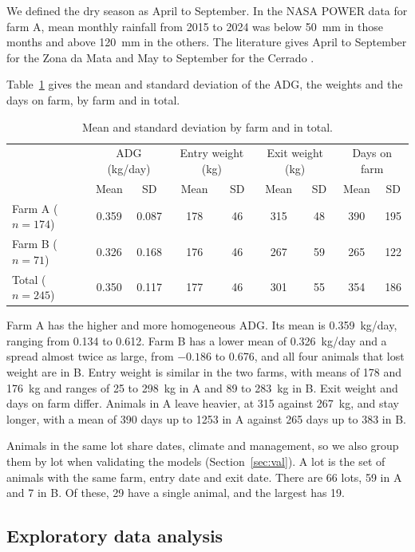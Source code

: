 \documentclass[runningheads]{llncs}
\begin{document}
We defined the dry season as April to September. In the NASA POWER data for farm A, mean monthly rainfall from 2015 to 2024 was below 50~mm in those months and above 120~mm in the others. The literature gives April to September for the Zona da Mata \cite{furlong1985} and May to September for the Cerrado \cite{gomes2015estrategias}.

Table~\ref{tab:desc} gives the mean and standard deviation of the ADG, the weights and the days on farm, by farm and in total.

\begin{table}[H]
\caption{Mean and standard deviation by farm and in total.}\label{tab:desc}
\small
\setlength{\tabcolsep}{4pt}
\begin{tabular}{lcccccccc}
\hline
 & \multicolumn{2}{c}{ADG (kg/day)} & \multicolumn{2}{c}{Entry weight (kg)} & \multicolumn{2}{c}{Exit weight (kg)} & \multicolumn{2}{c}{Days on farm}\\
 & Mean & SD & Mean & SD & Mean & SD & Mean & SD\\
\hline
Farm A ($n=174$) & 0.359 & 0.087 & 178 & 46 & 315 & 48 & 390 & 195\\
Farm B ($n=71$) & 0.326 & 0.168 & 176 & 46 & 267 & 59 & 265 & 122\\
Total ($n=245$) & 0.350 & 0.117 & 177 & 46 & 301 & 55 & 354 & 186\\
\hline
\end{tabular}
\end{table}

Farm A has the higher and more homogeneous ADG. Its mean is 0.359~kg/day, ranging from 0.134 to 0.612. Farm B has a lower mean of 0.326~kg/day and a spread almost twice as large, from $-0.186$ to 0.676, and all four animals that lost weight are in B. Entry weight is similar in the two farms, with means of 178 and 176~kg and ranges of 25 to 298~kg in A and 89 to 283~kg in B. Exit weight and days on farm differ. Animals in A leave heavier, at 315 against 267~kg, and stay longer, with a mean of 390 days up to 1253 in A against 265 days up to 383 in B.

Animals in the same lot share dates, climate and management, so we also group them by lot when validating the models (Section~\ref{sec:val}). A lot is the set of animals with the same farm, entry date and exit date. There are 66 lots, 59 in A and 7 in B. Of these, 29 have a single animal, and the largest has 19.

\subsection{Exploratory data analysis}
\end{document}
